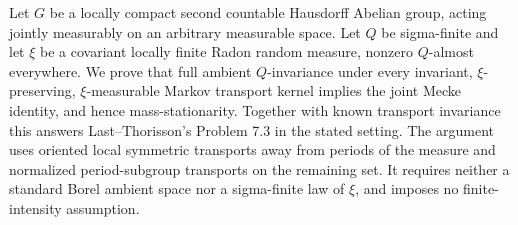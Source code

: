 Let $G$ be a locally compact second countable Hausdorff Abelian group, acting jointly measurably on an arbitrary measurable space. Let $Q$ be sigma-finite and let $\xi$ be a covariant locally finite Radon random measure, nonzero $Q$-almost everywhere. We prove that full ambient $Q$-invariance under every invariant, $\xi$-preserving, $\xi$-measurable Markov transport kernel implies the joint Mecke identity, and hence mass-stationarity. Together with known transport invariance this answers Last--Thorisson's Problem 7.3 in the stated setting. The argument uses oriented local symmetric transports away from periods of the measure and normalized period-subgroup transports on the remaining set. It requires neither a standard Borel ambient space nor a sigma-finite law of $\xi$, and imposes no finite-intensity assumption.
